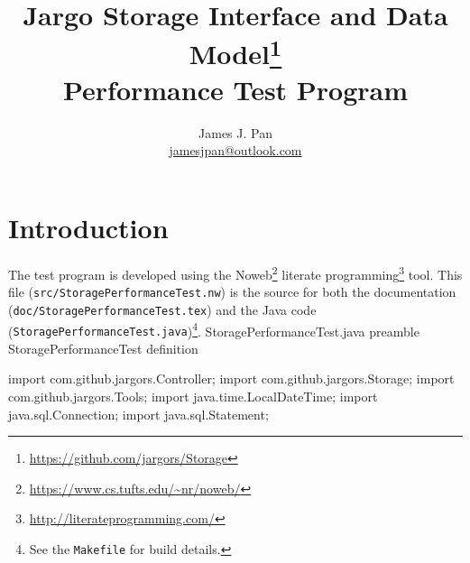 \documentclass{article}
\title{Jargo Storage Interface
  and Data Model\footnote{\url{https://github.com/jargors/Storage}}\\
  \vspace{.5em}
  \Large{\textbf{Performance Test Program}}}
\author{James J. Pan\\
  \small{\href{mailto:jamesjpan@outlook.com}{jamesjpan@outlook.com}}
}
\def\nwendcode{\endtrivlist \endgroup}
\let\nwdocspar=\par
\begin{document}
\maketitle
\pagestyle{noweb}


\tableofcontents

\section{Introduction}
\label{sec:introduction}
The test program is developed using the
Noweb\footnote{\url{https://www.cs.tufts.edu/~nr/noweb/}} literate
programming\footnote{\url{http://literateprogramming.com/}} tool.  This file
({\tt{}src/StoragePerformanceTest.nw}) is the source for both the documentation
({\tt{}doc/StoragePerformanceTest.tex}) and the Java code
({\tt{}StoragePerformanceTest.java})\footnote{See the {\tt{}Makefile} for build
details.}.
\endmoddef{}
\LA{}StoragePerformanceTest.java preamble~{\nwtagstyle{}}\RA{}
\LA{}\code{}StoragePerformanceTest\edoc{} definition~{\nwtagstyle{}}\RA{}
\nwendcode{}\nwdocspar

\nwenddocs{}\endmoddef{}
import com.github.jargors.Controller;
import com.github.jargors.Storage;
import com.github.jargors.Tools;
import java.time.LocalDateTime;
import java.sql.Connection;
import java.sql.Statement;
\nwendcode{}\nwdocspar
\end{document}
